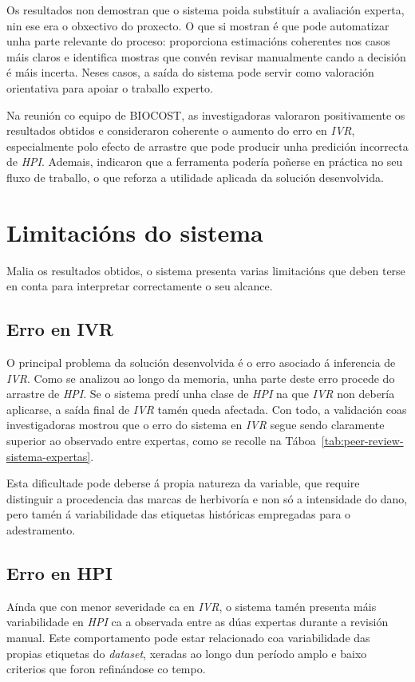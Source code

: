 Os resultados non demostran que o sistema poida substituír a avaliación experta, nin ese era o
obxectivo do proxecto. O que si mostran é que pode automatizar unha parte relevante do proceso:
proporciona estimacións coherentes nos casos máis claros e identifica mostras que convén revisar
manualmente cando a decisión é máis incerta. Neses casos, a saída do sistema pode servir
como valoración orientativa para apoiar o traballo experto.

Na reunión co equipo de BIOCOST, as investigadoras valoraron positivamente os resultados obtidos e
consideraron coherente o aumento do erro en \textit{IVR}, especialmente polo efecto de arrastre que
pode producir unha predición incorrecta de \textit{HPI}. Ademais, indicaron que a ferramenta podería
poñerse en práctica no seu fluxo de traballo, o que reforza a utilidade aplicada da solución
desenvolvida.

\section{Limitacións do sistema}
Malia os resultados obtidos, o sistema presenta varias limitacións que deben terse en conta para
interpretar correctamente o seu alcance.

\subsection{Erro en IVR}
O principal problema da solución desenvolvida é o erro asociado á inferencia de \textit{IVR}. Como se
analizou ao longo da memoria, unha parte deste erro procede do arrastre de \textit{HPI}. Se o sistema
predí unha clase de \textit{HPI} na que \textit{IVR} non debería aplicarse, a saída final de
\textit{IVR} tamén queda afectada. Con todo, a validación coas investigadoras mostrou que o erro do
sistema en \textit{IVR} segue sendo claramente superior ao observado entre expertas, como
se recolle na Táboa~\ref{tab:peer-review-sistema-expertas}.

Esta dificultade pode deberse á propia natureza da variable, que require distinguir a procedencia das
marcas de herbivoría e non só a intensidade do dano, pero tamén á variabilidade das etiquetas
históricas empregadas para o adestramento.

\subsection{Erro en HPI}
Aínda que con menor severidade ca en \textit{IVR}, o sistema tamén presenta máis variabilidade en
\textit{HPI} ca a observada entre as dúas expertas durante a revisión manual. Este comportamento pode
estar relacionado coa variabilidade das propias etiquetas do \textit{dataset}, xeradas ao longo dun
período amplo e baixo criterios que foron refinándose co tempo.

